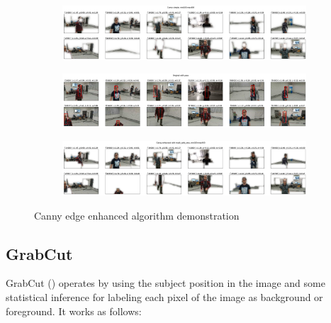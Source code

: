 \begin{figure}[!h]
	\begin{center}
		\begin{subfigure}[h]{1\textwidth}
			\centering
			\includegraphics[width=1\textwidth]{"contents/images/04-1canny-enhance-1"}
		\end{subfigure}
		\vfill
		\begin{subfigure}[h]{1\textwidth}
			\centering
			\includegraphics[width=1\textwidth]{"contents/images/04-1canny-enhance-2"}
		\end{subfigure}
		\vfill
		\begin{subfigure}[h]{1\textwidth}
			\centering
			\includegraphics[width=1\textwidth]{"contents/images/04-1canny-enhance-3"}
		\end{subfigure}
	\end{center}
	\vspace{-0.5cm}
	\caption[Canny edge enhanced algorithm demonstration]{Canny edge enhanced algorithm demonstration}
	\label{fig:canny-enanhced}
\end{figure}



\subsection{GrabCut}
\label{subsec:masking-grabcut}

GrabCut (\cite{opencv_grabcut}) operates by using the subject position in the image and some statistical inference for labeling each pixel of the image as background or foreground. It works as follows:

